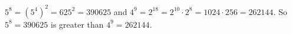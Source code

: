 $5^8=\left(5^4\right)^2=625^2=390625$ and $4^9=2^{18}=2^{10}\cdot2^8=1024\cdot256=262144$. So $\boxed{5^8=390625}$ is greater than $4^9=262144$.
